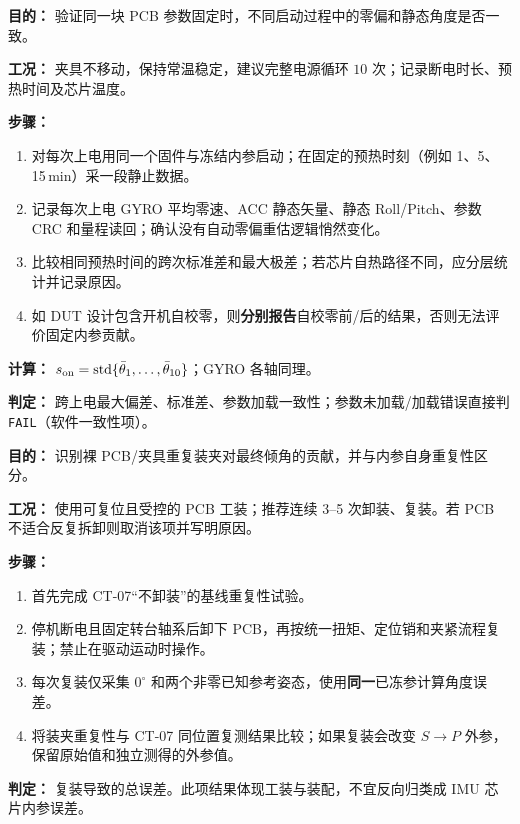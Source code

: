 \textbf{目的：} 验证同一块 PCB 参数固定时，不同启动过程中的零偏和静态角度是否一致。
\par\textbf{工况：} 夹具不移动，保持常温稳定，建议完整电源循环 $10$ 次；记录断电时长、预热时间及芯片温度。
\par\textbf{步骤：}
\begin{enumerate}
\item 对每次上电用同一个固件与冻结内参启动；在固定的预热时刻（例如 1、5、15\,min）采一段静止数据。
\item 记录每次上电 GYRO 平均零速、ACC 静态矢量、静态 Roll/Pitch、参数 CRC 和量程读回；确认没有自动零偏重估逻辑悄然变化。
\item 比较相同预热时间的跨次标准差和最大极差；若芯片自热路径不同，应分层统计并记录原因。
\item 如 DUT 设计包含开机自校零，则\textbf{分别报告}自校零前/后的结果，否则无法评价固定内参贡献。
\end{enumerate}
\textbf{计算：} $s_{\rm on}=\mathrm{std}\{\bar\theta_1,\ldots,\bar\theta_{10}\}$；GYRO 各轴同理。
\par\textbf{判定：} 跨上电最大偏差、标准差、参数加载一致性\pending；参数未加载/加载错误直接判\texttt{FAIL}（软件一致性项）。

\textbf{目的：} 识别裸 PCB/夹具重复装夹对最终倾角的贡献，并与内参自身重复性区分。
\par\textbf{工况：} 使用可复位且受控的 PCB 工装；推荐连续 3--5 次卸装、复装。若 PCB 不适合反复拆卸则取消该项并写明原因。
\par\textbf{步骤：}
\begin{enumerate}
\item 首先完成 CT-07“不卸装”的基线重复性试验。
\item 停机断电且固定转台轴系后卸下 PCB，再按统一扭矩、定位销和夹紧流程复装；禁止在驱动运动时操作。
\item 每次复装仅采集 $0^\circ$ 和两个非零已知参考姿态，使用\textbf{同一}已冻参计算角度误差。
\item 将装夹重复性与 CT-07 同位置复测结果比较；如果复装会改变 $S\rightarrow P$ 外参，保留原始值和独立测得的外参值。
\end{enumerate}
\textbf{判定：} 复装导致的总误差\pending。此项结果体现工装与装配，不宜反向归类成 IMU 芯片内参误差。

